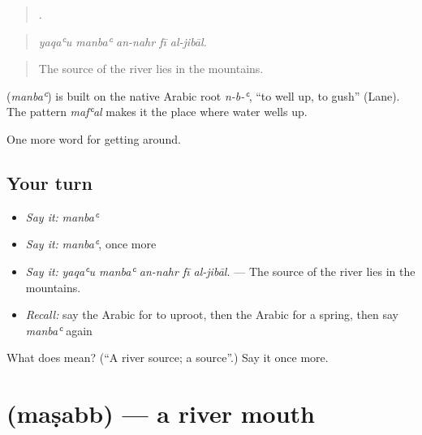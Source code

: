 \begin{quote}
    .
\end{quote}

\begin{quote}
\emph{yaqaʿu manbaʿ an-nahr fī al-jibāl.}
\end{quote}

\begin{quote}
The source of the river lies in the mountains.
\end{quote}

\begin{cousinweb}
\textbf{} (\emph{manbaʿ}) is built on the native Arabic root \emph{n-b-ʿ}, \textquotedblleft{}to well up, to gush\textquotedblright{} (Lane). The pattern \emph{mafʿal} makes it the place where water wells up.
\end{cousinweb}

\begin{grammarlens}[title={What you've built}]
One more word for getting around.
\end{grammarlens}

\subsection*{Your turn}
\begin{itemize}
\raggedright
  \item \emph{Say it:} \emph{manbaʿ}
  \item \emph{Say it:} \emph{manbaʿ}, once more
  \item \emph{Say it:} \emph{yaqaʿu manbaʿ an-nahr fī al-jibāl.} — The source of the river lies in the mountains.
  \item \emph{Recall:} say the Arabic for to uproot, then the Arabic for a spring, then say \emph{manbaʿ} again
\end{itemize}

\begin{tcolorbox}[breakable,colback=teal!4,colframe=teal!35!black,title={Before you move on}]
What does  mean? (\textquotedblleft{}A river source; a source\textquotedblright{}.) Say it once more.
\end{tcolorbox}
\section[\texorpdfstring{\ar{مصب} (maṣabb)}{مصب (maṣabb)}]{ (maṣabb) — a river mouth}

\label{lesson:AR-C470-masabb}



